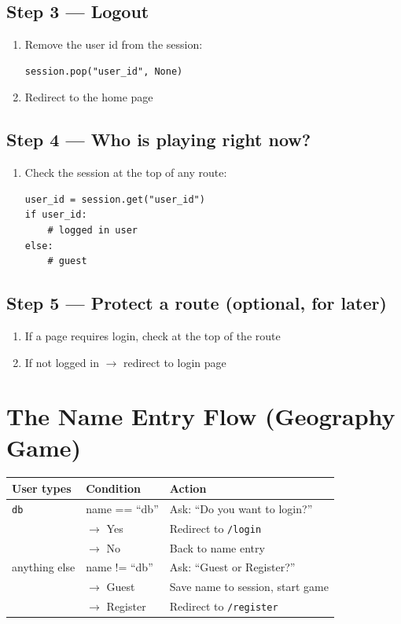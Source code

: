 \documentclass[12pt, a4paper]{article}
\begin{document}
\subsection{Step 3 --- Logout}
\begin{enumerate}
    \item Remove the user id from the session:
\begin{lstlisting}
session.pop("user_id", None)
\end{lstlisting}
    \item Redirect to the home page
\end{enumerate}

\subsection{Step 4 --- Who is playing right now?}
\begin{enumerate}
    \item Check the session at the top of any route:
\begin{lstlisting}
user_id = session.get("user_id")
if user_id:
    # logged in user
else:
    # guest
\end{lstlisting}
\end{enumerate}

\subsection{Step 5 --- Protect a route (optional, for later)}
\begin{enumerate}
    \item If a page requires login, check at the top of the route
    \item If not logged in $\rightarrow$ redirect to login page
\end{enumerate}

\section{The Name Entry Flow (Geography Game)}

\begin{center}
\begin{tabular}{lll}
\toprule
\textbf{User types} & \textbf{Condition} & \textbf{Action} \\
\midrule
\texttt{db}         & name == ``db''     & Ask: ``Do you want to login?'' \\
                    & $\rightarrow$ Yes  & Redirect to \texttt{/login} \\
                    & $\rightarrow$ No   & Back to name entry \\
\midrule
anything else       & name != ``db''     & Ask: ``Guest or Register?'' \\
                    & $\rightarrow$ Guest    & Save name to session, start game \\
                    & $\rightarrow$ Register & Redirect to \texttt{/register} \\
\bottomrule
\end{tabular}
\end{center}
\end{document}
